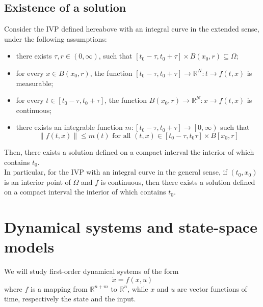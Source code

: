 \documentclass[12pt, openany]{report}
\theoremstyle{definition}
\newcommand{\R}{\mathbb{R}}
\begin{document}
\section{Existence of a solution}
Consider the IVP defined hereabove with an integral curve in the extended sense, under the following assumptions:
\begin{itemize}
    \item there exists \(\tau,r\in (0,\infty)\), such that \([t_0-\tau,t_0+\tau]\times B(x_0,r)\subseteq \Omega\);
    \item for every \(x\in B(x_0,r)\), the function \([t_0-\tau,t_0+\tau]\rightarrow \R^N:t\rightarrow f(t,x)\) is measurable;
    \item for every \(t\in [t_0-\tau,t_0+\tau]\), the function \(B(x_0,r)\rightarrow \R^N:x\rightarrow f(t,x)\) is continuous;
    \item there exists an integrable function \(m:[t_0-\tau,t_0+\tau]\rightarrow \left[0,\infty\right)\) such that \[\lVert f(t,x)\rVert \le m(t) \text{ for all }(t,x) \in [t_0-\tau,t_0\tau]\times B[x_0,r]\]
\end{itemize}
Then, there exists a solution defined on a compact interval the interior of which contains \(t_0\). \\
In particular, for the IVP with an integral curve in the general sense, if \((t_0,x_0)\) is an interior point of \(\Omega\) and \(f\) is continuous, then there exists a solution defined on a compact interval the interior of which contains \(t_0\).
\chapter{Dynamical systems and state-space models}
We will study first-order dynamical systems of the form 
\begin{equation}\label{eq:ODE}
    \dot x = f(x,u)
\end{equation}
where \(f\) is a mapping from \(\R^{n+m}\) to \(\R^n\), while \(x\) and \(u\) are vector functions of time, respectively the state and the input. 
\end{document}
